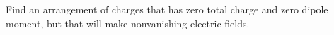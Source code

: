         Find an arrangement of charges that has zero total charge and
        zero dipole moment, but that will make nonvanishing electric fields.
